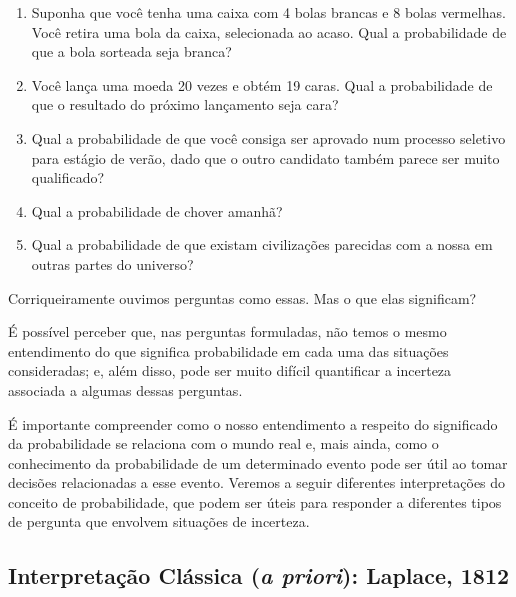 \documentclass[
]{book}
\providecommand{\tightlist}{%
  \setlength{\itemsep}{0pt}\setlength{\parskip}{0pt}}
\theoremstyle{definition}
\theoremstyle{definition}
\theoremstyle{definition}
\theoremstyle{remark}
\begin{document}
\begin{enumerate}
\def\labelenumi{(\arabic{enumi})}
\tightlist
\item
  Suponha que você tenha uma caixa com 4 bolas brancas e 8 bolas vermelhas. Você retira uma bola da caixa, selecionada ao acaso. Qual a probabilidade de que a bola sorteada seja branca?\\
\item
  Você lança uma moeda 20 vezes e obtém 19 caras. Qual a probabilidade de que o resultado do próximo lançamento seja cara?\\
\item
  Qual a probabilidade de que você consiga ser aprovado num processo seletivo para estágio de verão, dado que o outro candidato também parece ser muito qualificado?
\item
  Qual a probabilidade de chover amanhã?\\
\item
  Qual a probabilidade de que existam civilizações parecidas com a nossa em outras partes do universo?
\end{enumerate}

Corriqueiramente ouvimos perguntas como essas. Mas o que elas significam?

É possível perceber que, nas perguntas formuladas, não temos o mesmo entendimento do que significa probabilidade em cada uma das situações consideradas; e, além disso, pode ser muito difícil quantificar a incerteza associada a algumas dessas perguntas.

É importante compreender como o nosso entendimento a respeito do significado da probabilidade se relaciona com o mundo real e, mais ainda, como o conhecimento da probabilidade de um determinado evento pode ser útil ao tomar decisões relacionadas a esse evento. Veremos a seguir diferentes interpretações do conceito de probabilidade, que podem ser úteis para responder a diferentes tipos de pergunta que envolvem situações de incerteza.

\hypertarget{interpretauxe7uxe3o-cluxe1ssica-a-priori-laplace-1812}{%
\subsection*{\texorpdfstring{Interpretação Clássica (\emph{a priori}): Laplace, 1812}{Interpretação Clássica (a priori): Laplace, 1812}}\label{interpretauxe7uxe3o-cluxe1ssica-a-priori-laplace-1812}}
\end{document}
